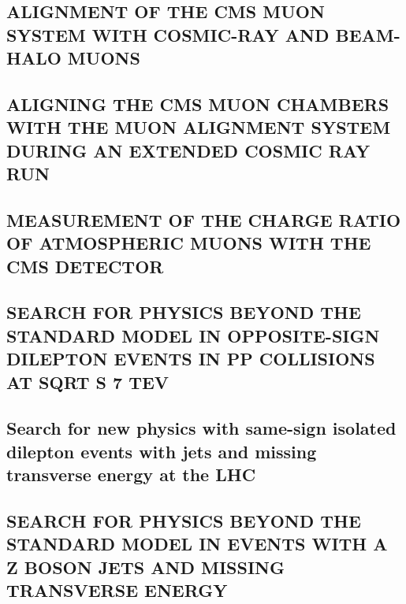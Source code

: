 \documentclass[a4paper, 11pt, twoside, openright]{report}
\begin{document}
\subsection{ALIGNMENT OF THE CMS MUON SYSTEM WITH COSMIC-RAY AND BEAM-HALO MUONS}


\subsection{ALIGNING THE CMS MUON CHAMBERS WITH THE MUON ALIGNMENT SYSTEM DURING AN EXTENDED COSMIC RAY RUN}


\subsection{MEASUREMENT OF THE CHARGE RATIO OF ATMOSPHERIC MUONS WITH THE CMS DETECTOR}


\subsection{SEARCH FOR PHYSICS BEYOND THE STANDARD MODEL IN OPPOSITE-SIGN DILEPTON EVENTS IN PP COLLISIONS AT SQRT S 7 TEV}


\subsection{Search for new physics with same-sign isolated dilepton events with jets and missing transverse energy at the LHC}


\subsection{SEARCH FOR PHYSICS BEYOND THE STANDARD MODEL IN EVENTS WITH A Z BOSON JETS AND MISSING TRANSVERSE ENERGY}

\end{document}
